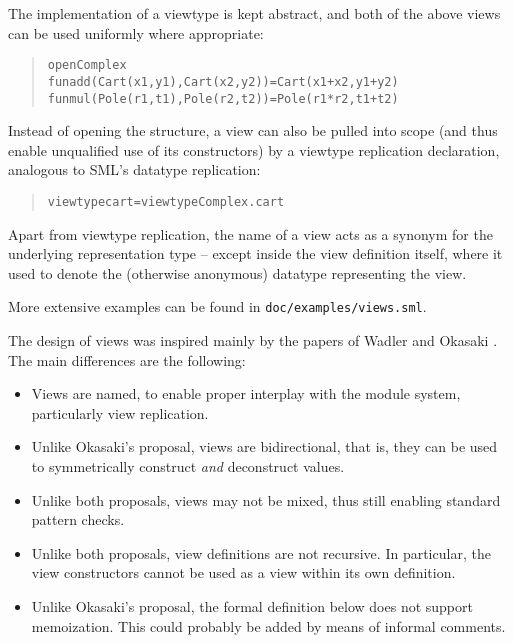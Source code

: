 \documentclass[twoside,titlepage]{article}
\begin{document}
\begin{appendix}
The implementation of a viewtype is kept abstract, and both of the above views can be used uniformly where appropriate:

\begin{quote}
\begin{alltt}
open Complex
fun add(Cart(x1,y1), Cart(x2,y2)) = Cart(x1+x2, y1+y2)
fun mul(Pole(r1,t1), Pole(r2,t2)) = Pole(r1*r2, t1+t2)
\end{alltt}
\end{quote}

Instead of opening the structure, a view can also be pulled into scope (and thus enable unqualified use of its constructors) by a viewtype replication declaration, analogous to SML's datatype replication:

\begin{quote}
\begin{alltt}
viewtype cart = viewtype Complex.cart
\end{alltt}
\end{quote}

Apart from viewtype replication, the name of a view acts as a synonym for the underlying representation type -- except inside the view definition itself, where it used to denote the (otherwise anonymous) datatype representing the view.

More extensive examples can be found in {\tt doc/examples/views.sml}.

The design of views was inspired mainly by the papers of Wadler \cite{views} and Okasaki \cite{sml-views}. The main differences are the following:

\begin{itemize}
\item Views are named, to enable proper interplay with the module system, particularly view replication.
\item Unlike Okasaki's proposal, views are bidirectional, that is, they can be used to symmetrically construct {\em and} deconstruct values.
\item Unlike both proposals, views may not be mixed, thus still enabling standard pattern checks.
\item Unlike both proposals, view definitions are not recursive. In particular, the view constructors cannot be used as a view within its own definition.
\item Unlike Okasaki's proposal, the formal definition below does not support memoization. This could probably be added by means of informal comments.
\end{itemize}



\end{appendix}
\end{document}
